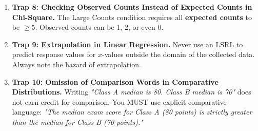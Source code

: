 \begin{enumerate}[leftmargin=1.5em]
  \item \textbf{Trap 8: Checking Observed Counts Instead of Expected Counts in Chi-Square.} The Large Counts condition requires all \textbf{expected counts} to be $\ge 5$. Observed counts can be 1, 2, or even 0.
  \item \textbf{Trap 9: Extrapolation in Linear Regression.} Never use an LSRL to predict response values for $x$-values outside the domain of the collected data. Always note the hazard of extrapolation.
  \item \textbf{Trap 10: Omission of Comparison Words in Comparative Distributions.} Writing \textit{"Class A median is 80. Class B median is 70"} does not earn credit for comparison. You MUST use explicit comparative language: \textit{"The median exam score for Class A (80 points) is strictly greater than the median for Class B (70 points)."}
\end{enumerate}
\clearpage
